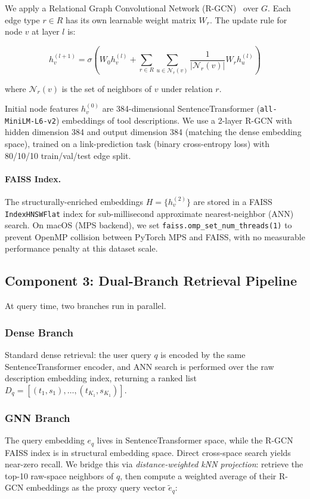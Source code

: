 \documentclass[conference]{IEEEtran}
\begin{document}
We apply a Relational Graph Convolutional Network
(R-GCN)~\cite{schlichtkrull2018rgcn} over $G$. Each edge type
$r \in R$ has its own learnable weight matrix $W_r$. The update rule
for node $v$ at layer $l$ is:

\begin{equation}
h_v^{(l+1)} = \sigma\!\left(
    W_0 h_v^{(l)} +
    \sum_{r \in R} \sum_{u \in \mathcal{N}_r(v)}
    \frac{1}{|\mathcal{N}_r(v)|} W_r h_u^{(l)}
\right)
\label{eq:rgcn}
\end{equation}

\noindent where $\mathcal{N}_r(v)$ is the set of neighbors of $v$
under relation $r$.

Initial node features $h_v^{(0)}$ are 384-dimensional
SentenceTransformer (\texttt{all-MiniLM-L6-v2}) embeddings of tool
descriptions. We use a 2-layer R-GCN with hidden dimension 384 and
output dimension 384 (matching the dense embedding space), trained on
a link-prediction task (binary cross-entropy loss) with 80/10/10
train/val/test edge split.

\paragraph{FAISS Index.}
The structurally-enriched embeddings
$H = \{h_v^{(2)}\}$ are stored in a FAISS
\texttt{IndexHNSWFlat} index for sub-millisecond approximate
nearest-neighbor (ANN) search. On macOS (MPS backend), we set
\texttt{faiss.omp\_set\_num\_threads(1)} to prevent OpenMP collision
between PyTorch MPS and FAISS, with no measurable performance penalty
at this dataset scale.

\subsection{Component 3: Dual-Branch Retrieval Pipeline}

At query time, two branches run in parallel.

\subsubsection{Dense Branch}
Standard dense retrieval: the user query $q$ is encoded by the same
SentenceTransformer encoder, and ANN search is performed over the raw
description embedding index, returning a ranked list
$D_q = [(t_1, s_1), \ldots, (t_{K_1}, s_{K_1})]$.

\subsubsection{GNN Branch}
The query embedding $e_q$ lives in SentenceTransformer space, while
the R-GCN FAISS index is in structural embedding space. Direct
cross-space search yields near-zero recall. We bridge this via
\emph{distance-weighted kNN projection}: retrieve the top-10
raw-space neighbors of $q$, then compute a weighted average of their
R-GCN embeddings as the proxy query vector $\tilde{e}_q$:
\end{document}
